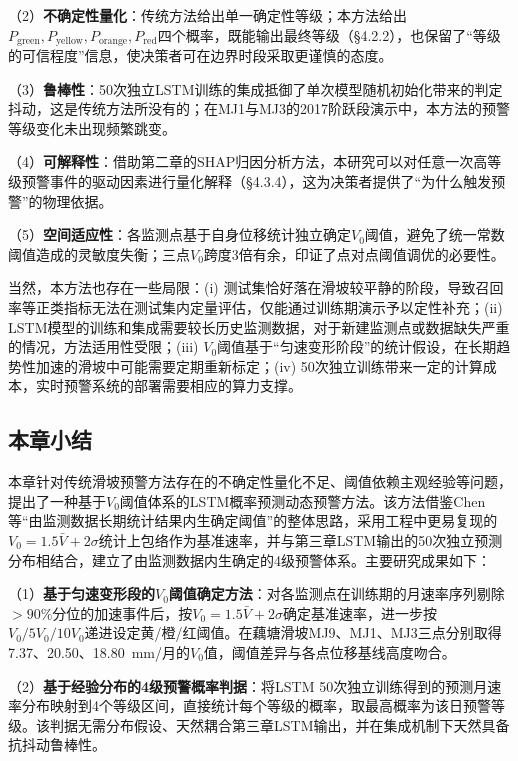\documentclass[12pt,a4paper]{article}
\begin{document}
\begin{sloppypar}
    （2）\textbf{不确定性量化}：传统方法给出单一确定性等级；本方法给出$P_{\text{green}}, P_{\text{yellow}}, P_{\text{orange}}, P_{\text{red}}$四个概率，既能输出最终等级（\S4.2.2），也保留了“等级的可信程度”信息，使决策者可在边界时段采取更谨慎的态度。
\end{sloppypar}

    （3）\textbf{鲁棒性}：50次独立LSTM训练的集成抵御了单次模型随机初始化带来的判定抖动，这是传统方法所没有的；在MJ1与MJ3的2017阶跃段演示中，本方法的预警等级变化未出现频繁跳变。

    （4）\textbf{可解释性}：借助第二章的SHAP归因分析方法，本研究可以对任意一次高等级预警事件的驱动因素进行量化解释（\S4.3.4），这为决策者提供了“为什么触发预警”的物理依据。

    （5）\textbf{空间适应性}：各监测点基于自身位移统计独立确定$V_0$阈值，避免了统一常数阈值造成的灵敏度失衡；三点$V_0$跨度3倍有余，印证了点对点阈值调优的必要性。

当然，本方法也存在一些局限：(i) 测试集恰好落在滑坡较平静的阶段，导致召回率等正类指标无法在测试集内定量评估，仅能通过训练期演示予以定性补充；(ii) LSTM模型的训练和集成需要较长历史监测数据，对于新建监测点或数据缺失严重的情况，方法适用性受限；(iii) $V_0$阈值基于“匀速变形阶段”的统计假设，在长期趋势性加速的滑坡中可能需要定期重新标定；(iv) 50次独立训练带来一定的计算成本，实时预警系统的部署需要相应的算力支撑。

\subsection{本章小结}

本章针对传统滑坡预警方法存在的不确定性量化不足、阈值依赖主观经验等问题，提出了一种基于$V_0$阈值体系的LSTM概率预测动态预警方法。该方法借鉴Chen等\cite{chen2024statistical}“由监测数据长期统计结果内生确定阈值”的整体思路，采用工程中更易复现的$V_0 = 1.5\bar V + 2\sigma$统计上包络作为基准速率，并与第三章LSTM输出的50次独立预测分布相结合，建立了由监测数据内生确定的4级预警体系。主要研究成果如下：

\begin{sloppypar}
    （1）\textbf{基于匀速变形段的$V_0$阈值确定方法}：对各监测点在训练期的月速率序列剔除$>90\%$分位的加速事件后，按$V_0 = 1.5\bar V + 2\sigma$确定基准速率，进一步按$V_0/5V_0/10V_0$递进设定黄/橙/红阈值。在藕塘滑坡MJ9、MJ1、MJ3三点分别取得7.37、20.50、18.80~mm/月的$V_0$值，阈值差异与各点位移基线高度吻合。
\end{sloppypar}

    （2）\textbf{基于经验分布的4级预警概率判据}：将LSTM 50次独立训练得到的预测月速率分布映射到4个等级区间，直接统计每个等级的概率，取最高概率为该日预警等级。该判据无需分布假设、天然耦合第三章LSTM输出，并在集成机制下天然具备抗抖动鲁棒性。
\end{document}
